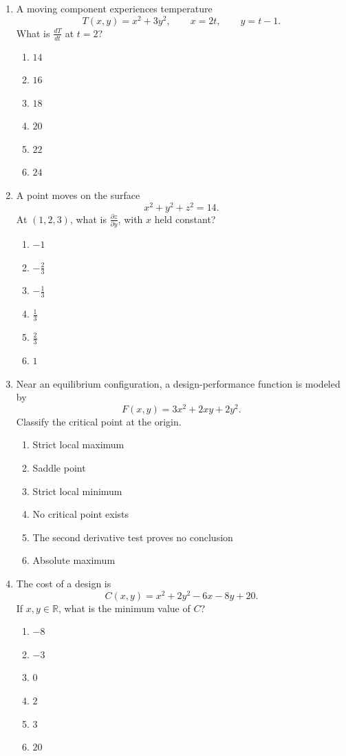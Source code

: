 \documentclass[a4paper,12pt]{article}
\theoremstyle{mystyle}
\numberwithin{equation}{section}
\numberwithin{theorem}{section}
\numberwithin{proposition}{section}
\numberwithin{example}{section}
\numberwithin{remark}{section}
\numberwithin{lemma}{section}
\numberwithin{corollary}{section}
\numberwithin{definition}{section}
\begin{document}
\begin{enumerate}[label=\textbf{Question \arabic*.},leftmargin=*]
\item A moving component experiences temperature
\[
T(x,y)=x^2+3y^2,
\qquad x=2t,\qquad y=t-1.
\]
What is \(\frac{dT}{dt}\) at \(t=2\)?
\begin{enumerate}[label=(\Alph*)]
\item \(14\)
\item \(16\)
\item \(18\)
\item \(20\)
\item \(22\)
\item \(24\)
\end{enumerate}

\item A point moves on the surface
\[
x^2+y^2+z^2=14.
\]
At \((1,2,3)\), what is \(\frac{\partial z}{\partial y}\), with
\(x\) held constant?
\begin{enumerate}[label=(\Alph*)]
\item \(-1\)
\item \(-\frac23\)
\item \(-\frac13\)
\item \(\frac13\)
\item \(\frac23\)
\item \(1\)
\end{enumerate}

\item Near an equilibrium configuration, a design-performance
function is modeled by
\[
F(x,y)=3x^2+2xy+2y^2.
\]
Classify the critical point at the origin.
\begin{enumerate}[label=(\Alph*)]
\item Strict local maximum
\item Saddle point
\item Strict local minimum
\item No critical point exists
\item The second derivative test proves no conclusion
\item Absolute maximum
\end{enumerate}

\item The cost of a design is
\[
C(x,y)=x^2+2y^2-6x-8y+20.
\]
If \(x,y\in\mathbb{R}\), what is the minimum value of \(C\)?
\begin{enumerate}[label=(\Alph*)]
\item \(-8\)
\item \(-3\)
\item \(0\)
\item \(2\)
\item \(3\)
\item \(20\)
\end{enumerate}


\end{enumerate}
\end{document}
